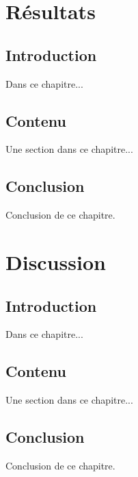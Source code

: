 \documentclass[a4paper,11pt,twoside]{memoir}
\begin{document}

\chapter{Résultats}
\label{chap:resultats}
\minitoc

\section{Introduction}
Dans ce chapitre...

\section{Contenu}
Une section dans ce chapitre...

\section{Conclusion}
Conclusion de ce chapitre.



\chapter{Discussion}
\label{chap:discussion}
\minitoc

\section{Introduction}
Dans ce chapitre...

\section{Contenu}
Une section dans ce chapitre...

\section{Conclusion}
Conclusion de ce chapitre.



\cleardoublepage{} %
\end{document}
